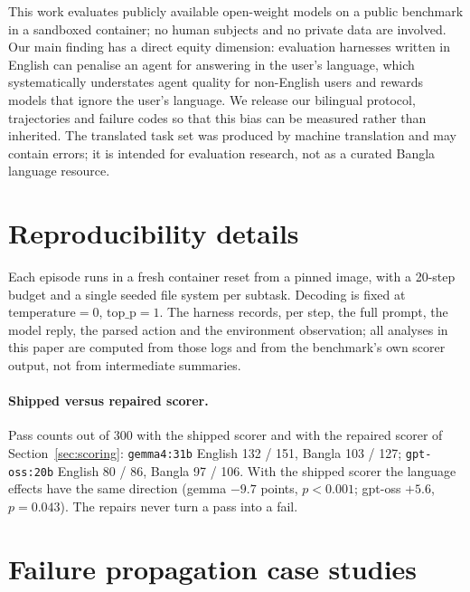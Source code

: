 \documentclass[11pt]{article}
\begin{document}
This work evaluates publicly available open-weight models on a public benchmark in a sandboxed
container; no human subjects and no private data are involved. Our main finding has a direct
equity dimension: evaluation harnesses written in English can penalise an agent for answering in
the user's language, which systematically understates agent quality for non-English users and
rewards models that ignore the user's language. We release our bilingual protocol, trajectories
and failure codes so that this bias can be measured rather than inherited. The translated task
set was produced by machine translation and may contain errors; it is intended for evaluation
research, not as a curated Bangla language resource.



\appendix

\section{Reproducibility details}
\label{app:repro}

Each episode runs in a fresh container reset from a pinned image, with a 20-step budget and a
single seeded file system per subtask. Decoding is fixed at $\mathrm{temperature}=0$,
$\mathrm{top\_p}=1$. The harness records, per step, the full prompt, the model reply, the parsed
action and the environment observation; all analyses in this paper are computed from those logs
and from the benchmark's own scorer output, not from intermediate summaries.

\paragraph{Shipped versus repaired scorer.} Pass counts out of 300 with the shipped scorer and
with the repaired scorer of Section~\ref{sec:scoring}: \texttt{gemma4:31b} English 132 / 151,
Bangla 103 / 127; \texttt{gpt-oss:20b} English 80 / 86, Bangla 97 / 106. With the shipped scorer
the language effects have the same direction (gemma $-9.7$ points, $p<0.001$; gpt-oss $+5.6$,
$p=0.043$). The repairs never turn a pass into a fail.

\section{Failure propagation case studies}
\label{app:chains}
\end{document}
